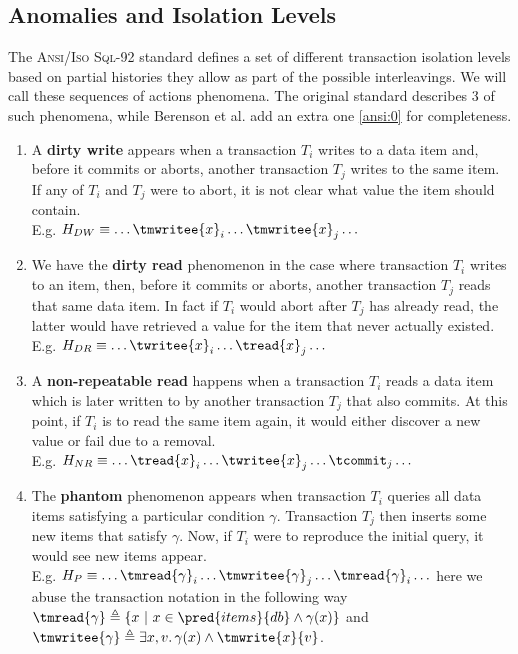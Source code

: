 \tocless\subsection{Anomalies and Isolation Levels}

The \textsc{Ansi/Iso Sql-92} standard \cite{ansi92} defines a set of different transaction isolation levels based on partial histories they allow as part of the possible interleavings. We will call these sequences of actions phenomena. The original standard describes 3 of such phenomena, while Berenson et al. \cite{isolationansi} add an extra one \ref{ansi:0} for completeness. \\

\begin{enumerate}[label=(\textbf{P\arabic*})]\addtocounter{enumi}{-1}
\item \label{ansi:0} A \textbf{dirty write} appears when a transaction $T_i$ writes to a data item and, before it commits or aborts, another transaction $T_j$ writes to the same item. If any of $T_i$ and $T_j$ were to abort, it is not clear what value the item should contain.
\\
E.g. $H_{DW} \equiv \ldots \tmwritee{x}_i \ldots \tmwritee{x}_j \ldots$
\item We have the \textbf{dirty read} phenomenon in the case where transaction $T_i$ writes to an item, then, before it commits or aborts, another transaction $T_j$ reads that same data item. In fact if $T_i$ would abort after $T_j$ has already read, the latter would have retrieved a value for the item that never actually existed.
\\
E.g. $H_{DR} \equiv \ldots \twritee{x}_i \ldots \tread{x}_j \ldots$
\item A \textbf{non-repeatable read} happens when a transaction $T_i$ reads a data item which is later written to by another transaction $T_j$ that also commits. At this point, if $T_i$ is to read the same item again, it would either discover a new value or fail due to a removal.
\\
E.g. $H_{NR} \equiv \ldots \tread{x}_i \ldots \twritee{x}_j \ldots \tcommit_j \ldots$
\item The \textbf{phantom} phenomenon appears when transaction $T_i$ queries all data items satisfying a particular condition $\gamma$. Transaction $T_j$ then inserts some new items that satisfy $\gamma$. Now, if $T_i$ were to reproduce the initial query, it would see new items appear.
\\
E.g. $H_{P} \equiv \ldots \tmread{\gamma}_i \ldots \tmwritee{\gamma}_j \ldots \tmread{\gamma}_i \ldots$ here we abuse the transaction notation in the following way $\tmread{\gamma} \triangleq \left\lbrace x\ |\ x \in \pred{items}{db} \land \gamma(x) \right\rbrace$ and $\tmwritee{\gamma} \triangleq \exists x, v \ldotp \gamma(x) \land \tmwrite{x}{v}$.
\end{enumerate}

